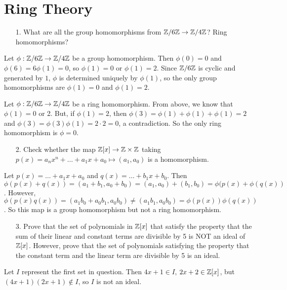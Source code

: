 \documentclass{hmwk}
\begin{document}
\section{Ring Theory}

\begin{itemize}
    \item[1.] What are all the group homomorphisms from $\mathbb{Z}/6\mathbb{Z} \rightarrow \mathbb{Z}/4\mathbb{Z}$? Ring homomorphisms?
\end{itemize}

\pre Let $\phi: \mathbb{Z}/6\mathbb{Z} \rightarrow \mathbb{Z}/4\mathbb{Z}$ be a group homomorphism. Then $\phi(0) = 0$ and $\phi(6) = 6\phi(1) = 0$, so $\phi(1) = 0$ or $\phi(1) = 2$. Since $\mathbb{Z}/6\mathbb{Z}$ is cyclic and generated by $1$, $\phi$ is determined uniquely by $\phi(1)$, so the only group homomorphisms are $\phi(1) = 0$ and $\phi(1) = 2$.

\pre Let $\phi: \mathbb{Z}/6\mathbb{Z} \rightarrow \mathbb{Z}/4\mathbb{Z}$ be a ring homomorphism. From above, we know that $\phi(1) = 0$ or 2. But, if $\phi(1) = 2$, then $\phi(3) = \phi(1) + \phi(1) + \phi(1) = 2$ and $\phi(3) = \phi(3)\phi(1) = 2 \cdot 2 = 0$, a contradiction. So the only ring homomorphism is $\phi = 0$. 

\begin{itemize}
    \item[2.] Check whether the map $\mathbb{Z}[x] \rightarrow \mathbb{Z} \times \mathbb{Z}$ taking $p(x) = a_nx^n + \dots + a_1x + a_0  \mapsto (a_1, a_0)$ is a homomorphism. 
\end{itemize}

\pre Let $p(x) = \dots + a_1x + a_0$ and $q(x) = \dots + b_1x + b_0$. Then $\phi(p(x) + q(x)) = (a_1 + b_1, a_0 + b_0) = (a_1, a_0) + (b_1, b_0) = \phi(p(x) + \phi(q(x))$. However, $\phi(p(x)q(x)) = (a_1b_0 + a_0b_1, a_0b_0) \neq (a_1b_1, a_0b_0) = \phi(p(x))\phi(q(x))$. So this map is a group homomorphism but not a ring homomorphism. 

\begin{itemize}
    \item[3.]  Prove that the set of polynomials in $\mathbb{Z}[x]$ that satisfy the property that the sum of their linear and constant terms are divisible by 5 is NOT an ideal of $\mathbb{Z}[x]$. However, prove that the set of polynomials satisfying the property that the constant term and the linear term are divisible by 5 is an ideal.
\end{itemize}

\pre Let $I$ represent the first set in question. Then $4x + 1 \in I$, $2x + 2 \in \mathbb{Z}[x]$, but $(4x + 1)(2x + 1) \notin I$, so $I$ is not an ideal. 
\end{document}
